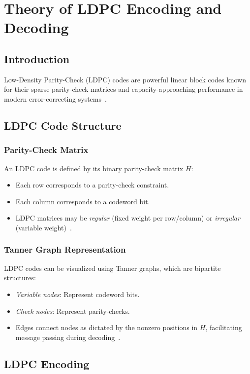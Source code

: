 \documentclass[../main.tex]{subfiles}
\begin{document}
\chapter{Theory of LDPC Encoding and Decoding}

\section{Introduction}
Low-Density Parity-Check (LDPC) codes are powerful linear block codes known for their sparse parity-check matrices and capacity-approaching performance in modern error-correcting systems~\cite{Karthikeyan2020, Schmalen2021, Condo2019}.

\section{LDPC Code Structure}

\subsection{Parity-Check Matrix}
An LDPC code is defined by its binary parity-check matrix $H$:
\begin{itemize}
    \item Each row corresponds to a parity-check constraint.
    \item Each column corresponds to a codeword bit.
    \item LDPC matrices may be \emph{regular} (fixed weight per row/column) or \emph{irregular} (variable weight)~\cite{Karthikeyan2020, Schmalen2021, Liu2012}.
\end{itemize}

\subsection{Tanner Graph Representation}
LDPC codes can be visualized using Tanner graphs, which are bipartite structures:
\begin{itemize}
    \item \emph{Variable nodes}: Represent codeword bits.
    \item \emph{Check nodes}: Represent parity-checks.
    \item Edges connect nodes as dictated by the nonzero positions in $H$, facilitating message passing during decoding~\cite{Schmalen2021, Liu2012}.
\end{itemize}

\section{LDPC Encoding}
\end{document}
